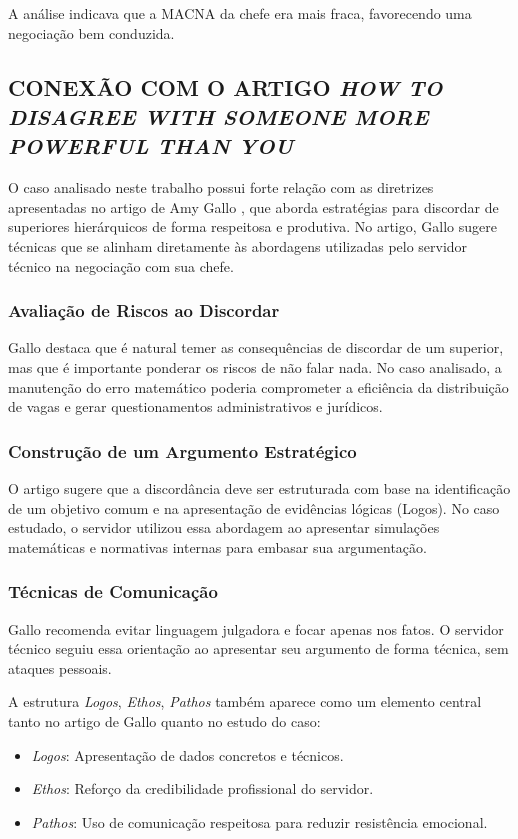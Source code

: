 \documentclass[article,12pt,oneside,a4paper]{article}
\begin{document}
A análise indicava que a MACNA da chefe era mais fraca, favorecendo uma negociação bem conduzida.
\subsection{CONEXÃO COM O ARTIGO \emph{HOW TO DISAGREE WITH SOMEONE MORE POWERFUL THAN YOU}}
\label{sec:orgd4193c2}

O caso analisado neste trabalho possui forte relação com as diretrizes apresentadas no artigo de Amy Gallo \cite{gallo2016how}, que aborda estratégias para discordar de superiores hierárquicos de forma respeitosa e produtiva. No artigo, Gallo sugere técnicas que se alinham diretamente às abordagens utilizadas pelo servidor técnico na negociação com sua chefe.
\subsubsection{Avaliação de Riscos ao Discordar}
\label{sec:org5fe1a0b}

Gallo destaca que é natural temer as consequências de discordar de um superior, mas que é importante ponderar os riscos de não falar nada. No caso analisado, a manutenção do erro matemático poderia comprometer a eficiência da distribuição de vagas e gerar questionamentos administrativos e jurídicos.
\subsubsection{Construção de um Argumento Estratégico}
\label{sec:org12a410a}

O artigo sugere que a discordância deve ser estruturada com base na identificação de um objetivo comum e na apresentação de evidências lógicas (Logos). No caso estudado, o servidor utilizou essa abordagem ao apresentar simulações matemáticas e normativas internas para embasar sua argumentação.
\subsubsection{Técnicas de Comunicação}
\label{sec:org15da8eb}

Gallo recomenda evitar linguagem julgadora e focar apenas nos fatos. O servidor técnico seguiu essa orientação ao apresentar seu argumento de forma técnica, sem ataques pessoais.

A estrutura \emph{Logos}, \emph{Ethos}, \emph{Pathos} também aparece como um elemento central tanto no artigo de Gallo quanto no estudo do caso:

\begin{itemize}
\item \emph{Logos}: Apresentação de dados concretos e técnicos.

\item \emph{Ethos}: Reforço da credibilidade profissional do servidor.

\item \emph{Pathos}: Uso de comunicação respeitosa para reduzir resistência emocional.
\end{itemize}
\end{document}
